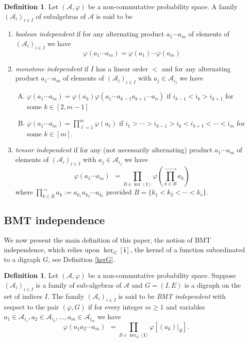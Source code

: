 \documentclass[a4paper,12pt]{extarticle}
\theoremstyle{definition}
\newtheorem{defn}[thm]{Definition}
\theoremstyle{remark}
\def\AA{\mathcal{A}}
\begin{document}
\begin{defn}\label{dfn:boolean_tensor_monotone}
	Let $(\AA,\varphi)$ be a non-commutative probability space. A family $(\mathcal{A}_i)_{i \in I}$  of subalgebras of $\mathcal{A}$ is said to be   
	\begin{enumerate}
		\item[(\textbf{B})] \emph{boolean independent} if for any alternating product $a_1 \cdots a_m$ of elements of  $(\mathcal{A}_i)_{i \in I}$ we have
		\[\varphi(a_1\cdots a_m)=\varphi(a_1)\cdots \varphi(a_m) \] 
		\item[(\textbf{M})] \emph{monotone independent} if $I$ has a linear order $<$ and for any alternating product $a_1 \cdots a_m$ of elements of  $(\mathcal{A}_i)_{i \in I}$ with $a_j \in \mathcal{A}_{i_j}$ we have 
		\begin{enumerate}[M.1]
			\item $\varphi(a_1 \cdots a_m) = \varphi(a_k) \varphi(a_1 \cdots a_{k-1}a_{k+1}\cdots a_n)$ if $ i_{k-1} < i_k >  i_{k+1}$ for some $k \in [2,m-1]$  \ \\ 
			\item $\varphi(a_1 \cdots a_m) = \prod_{\ell=1}^{m}\varphi(a_\ell)$ if $ i_1 > \cdots > i_{k-1} > i_k < i_{k+1} < \cdots < i_m$ for some $k \in [m]$. 
		\end{enumerate}
		
		\item[(\textbf{T})] \emph{tensor independent} if for any (not necessarily alternating) product $a_1 \cdots a_m$ of elements of  $(\mathcal{A}_i)_{i \in I}$ with $a_j \in \mathcal{A}_{i_j}$ we have 
		\[
		\varphi(a_1\cdots a_m) \ \ = \prod_{B \in \ker({\bm i})} \varphi \left( \prod_{k \in B}^{\to} a_k\right) 
		\]
		where $\prod_{k \in B}^{\rightarrow} a_k := a_{k_1} a_{k_2} \cdots a_{k_r}$ provided $B = \{k_1 < k_2 < \cdots < k_r \}$. 
	\end{enumerate}
\end{defn}




\subsection{BMT independence}
%
%
We now present the main definition of this paper, the notion of BMT independence, which relies upon $\ker_G[\bm{i}]$, the kernel of a function subordinated to a digraph $G$, see Definition \ref{kerG}. 
%
\begin{defn}\label{def: BMT independence}
	Let $(\AA,\varphi)$ be a non-commutative probability space. 
	Suppose $(\mathcal{A}_i)_{i \in I}$ is a family of sub-algebras of $\AA$ and $G=(I,E)$ is a digraph on the set of indices $I$.
	The family $(\mathcal{A}_i)_{i \in I}$ is said to be \emph{BMT independent} with respect to the pair $(\varphi,G)$  if 
	for every integer $m \geq 1$ and variables $a_1 \in \mathcal{A}_{i_1}, a_2 \in \mathcal{A}_{i_2}, \ldots, a_m \in \mathcal{A}_{i_m}$ we have
	\[
	\varphi( a_1 a_2 \cdots a_m ) 
	\ \ =  \prod_{B \in \ker_G[\bm{i}]} 
	\varphi[(a_k)|_B].
	\]
\end{defn}
\end{document}
